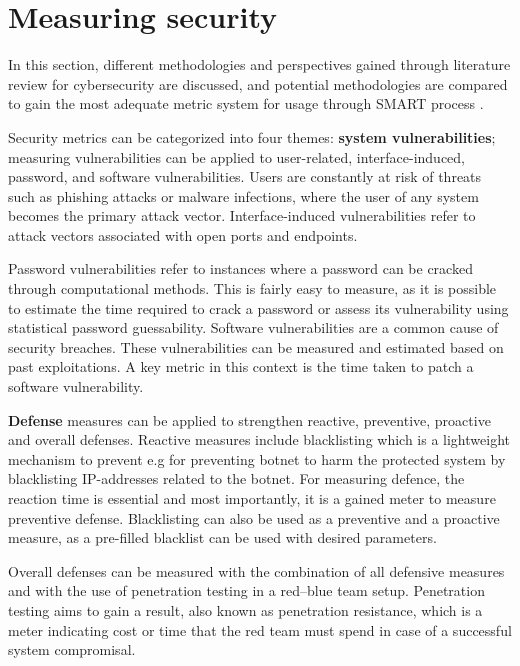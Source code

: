 \section{Measuring security} \label{measuringsecurity}

In this section, different methodologies and perspectives gained
through literature review for cybersecurity are discussed, and
potential methodologies are compared to gain the most adequate metric
system for usage through SMART process \cite{payne2006guide}.

Security metrics can be categorized into four themes:
\textbf{system vulnerabilities}; measuring vulnerabilities can be
applied to user-related, interface-induced, password, and software
vulnerabilities. Users are constantly at risk of threats such as
phishing attacks or malware infections, where the user of any system
becomes the primary attack vector. Interface-induced vulnerabilities refer to attack vectors associated with open ports
and endpoints. \cite{pendleton2016survey}

Password vulnerabilities refer to instances where a password can be
cracked through computational methods. This is fairly easy to measure,
as it is possible to estimate the time required to crack a password or
assess its vulnerability using statistical password
guessability. Software vulnerabilities are a common cause of security
breaches. These vulnerabilities can be measured and estimated based on
past exploitations. A key metric in this context is the time taken to
patch a software vulnerability. \cite{pendleton2016survey}

\textbf{Defense} measures can be applied to strengthen reactive,
preventive, proactive and overall defenses. Reactive measures include
blacklisting which is a lightweight mechanism to prevent e.g for preventing botnet to harm
the protected system by blacklisting IP-addresses related to the
botnet. For measuring defence, the reaction time is essential and
most importantly, it is a gained meter to measure preventive
defense. Blacklisting can also be used as a preventive and a proactive
measure, as a pre-filled blacklist can be used with desired
parameters. \cite{pendleton2016survey, ramos2017model}

Overall defenses can be measured with the combination of all defensive
measures and with the use of penetration testing in a red–blue team
setup. Penetration testing aims to gain a result, also known as
penetration resistance, which is a meter indicating cost or time that
the red team must spend in case of a successful system
compromisal. \cite{pendleton2016survey, ramos2017model}


